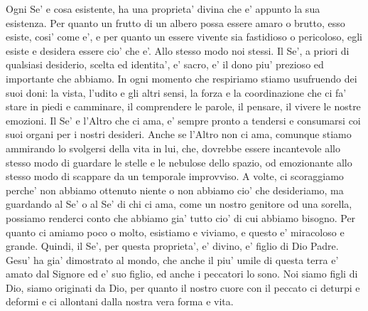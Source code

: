  Ogni Se' e cosa esistente, ha una proprieta' divina che e' appunto la sua esistenza. Per quanto un frutto di un albero possa essere amaro o brutto, esso esiste, cosi' come e', e per quanto un essere vivente sia fastidioso o pericoloso, egli esiste e desidera essere cio' che e'. Allo stesso modo noi stessi.  Il Se', a priori di qualsiasi desiderio, scelta ed identita', e' sacro, e' il dono piu' prezioso ed importante che abbiamo. In ogni momento che respiriamo stiamo usufruendo dei suoi doni: la vista, l'udito e gli altri sensi, la forza e la coordinazione che ci fa' stare in piedi e camminare, il comprendere le parole, il pensare, il vivere le nostre emozioni. Il Se' e l'Altro che ci ama, e' sempre pronto a tendersi e consumarsi coi suoi organi per i nostri desideri. Anche se l'Altro non ci ama, comunque stiamo ammirando lo svolgersi della vita in lui, che, dovrebbe essere incantevole allo stesso modo di guardare le stelle e le nebulose dello spazio, od emozionante allo stesso modo di scappare da un temporale improvviso. A volte, ci scoraggiamo perche' non abbiamo ottenuto niente o non abbiamo cio' che desideriamo, ma guardando al Se' o al Se' di chi ci ama, come un nostro genitore od una sorella, possiamo renderci conto che abbiamo gia' tutto cio' di cui abbiamo bisogno.
Per quanto ci amiamo poco o molto, esistiamo e viviamo, e questo e' miracoloso e grande. Quindi, il Se', per questa proprieta', e' divino, e' figlio di Dio Padre. Gesu' ha gia' dimostrato al mondo, che anche il piu' umile di questa terra e' amato dal Signore ed e' suo figlio, ed anche i peccatori lo sono. Noi siamo figli di Dio, siamo originati da Dio, per quanto il nostro cuore con il peccato ci deturpi e deformi e ci allontani dalla nostra vera forma e vita. 
